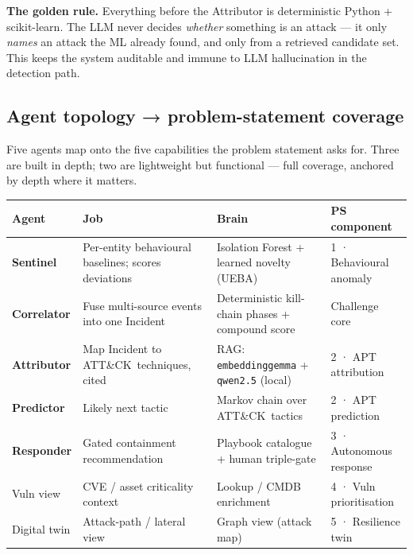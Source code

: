 \documentclass[11pt,a4paper]{article}
\begin{document}
\begin{goldbox}
\textbf{The golden rule.} Everything before the Attributor is deterministic Python +
scikit-learn. The LLM never decides \emph{whether} something is an attack — it only
\emph{names} an attack the ML already found, and only from a retrieved candidate set. This
keeps the system auditable and immune to LLM hallucination in the detection path.
\end{goldbox}

\subsection{Agent topology → problem-statement coverage}

Five agents map onto the five capabilities the problem statement asks for. Three are built in
depth; two are lightweight but functional — full coverage, anchored by depth where it matters.

\begin{center}
\begin{tabularx}{\linewidth}{@{}L{2.4cm} Y L{4.3cm} L{2.6cm}@{}}
\toprule
\textbf{Agent} & \textbf{Job} & \textbf{Brain} & \textbf{PS component} \\
\midrule
\textbf{Sentinel}   & Per-entity behavioural baselines; scores deviations & Isolation Forest + learned novelty (UEBA) & 1 · Behavioural anomaly \\
\textbf{Correlator} & Fuse multi-source events into one Incident & Deterministic kill-chain phases + compound score & Challenge core \\
\textbf{Attributor} & Map Incident to ATT\&CK\ techniques, cited & RAG: \texttt{embeddinggemma} + \texttt{qwen2.5} (local) & 2 · APT attribution \\
\textbf{Predictor}  & Likely next tactic & Markov chain over ATT\&CK\ tactics & 2 · APT prediction \\
\textbf{Responder}  & Gated containment recommendation & Playbook catalogue + human triple-gate & 3 · Autonomous response \\
Vuln view           & CVE / asset criticality context & Lookup / CMDB enrichment & 4 · Vuln prioritisation \\
Digital twin        & Attack-path / lateral view & Graph view (attack map) & 5 · Resilience twin \\
\bottomrule
\end{tabularx}
\end{center}

\end{document}
